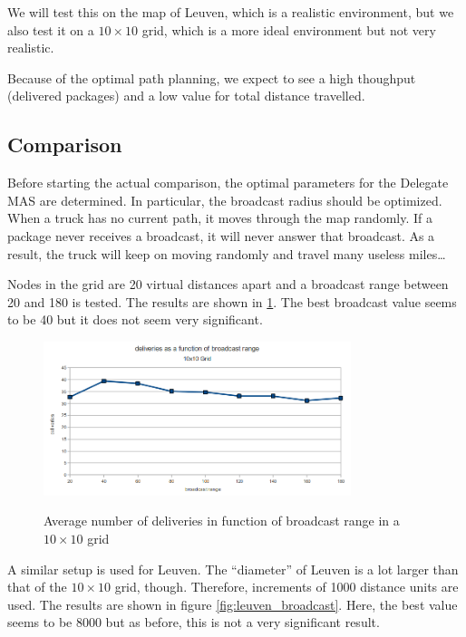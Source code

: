 \npar We will test this on the map of Leuven, which is a realistic environment,
but we also test it on a $10\times10$ grid, which is a more ideal environment
but not very realistic.

\npar  Because of the optimal path planning, we expect to see a high thoughput
(delivered packages) and a low value for total distance travelled.

\subsection{Comparison}

\npar Before starting the actual comparison, the optimal parameters for the
Delegate MAS are determined. In particular, the broadcast radius should be
optimized. When a truck has no current path, it moves through the map randomly.
If a package never receives a broadcast, it will never answer that broadcast. As
a result, the truck will keep on moving randomly and travel many useless
miles\ldots

\npar Nodes in the grid are 20 virtual distances apart and a broadcast range
between 20 and 180 is tested. The results are shown in \ref{fig:grid_broadcast}.
The best broadcast value seems to be 40 but it does not seem very significant.

\begin{figure}[H]
	\begin{center}
		\includegraphics[width=0.8\textwidth]{./figs/grid_broadcastRangeExperiment.png}
		\label{fig:grid_broadcast}
		\caption{Average number of deliveries in function of broadcast range in a
		$10\times10$ grid}
	\end{center}
\end{figure}

\npar A similar setup is used for Leuven. The ``diameter'' of Leuven is a lot
larger than that of the $10\times10$ grid, though. Therefore, increments of 1000
distance units are used. The results are shown in figure
\ref{fig:leuven_broadcast}. Here, the best value seems to be 8000 but as
before, this is not a very significant result.

